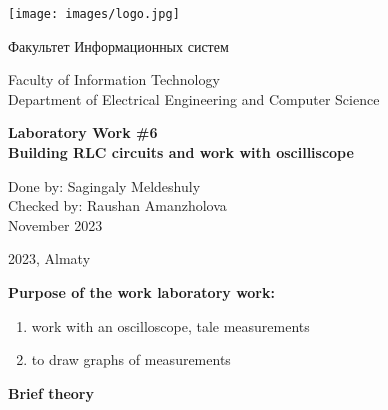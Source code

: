 \documentclass{article}
\begin{document}
\begin{titlepage}
    \centering
    \texttt{[image: images/logo.jpg]}
    
    \vspace{0cm} %
    {\fontsize{40}{48}\selectfont Факультет Информационных систем} %
    
    \vspace{0.1cm} %
    
    \begin{center} %
        Faculty of Information Technology\\
        Department of Electrical Engineering and Computer Science
    \end{center}
    
    \vfill %
    
    
    {\LARGE\bfseries Laboratory Work \#6}\\
    {\LARGE\bfseries Building RLC circuits and work with oscilliscope}
    \vspace{4cm} %
    
    \begin{flushright}
        Done by: Sagingaly Meldeshuly \\
        Checked by: Raushan Amanzholova \\
        November 2023
    \end{flushright}
    
    \vfill %
    \begin{center}
        2023, Almaty
    \end{center}
    
\end{titlepage}


\begin{flushleft}
\textbf{Purpose of the work laboratory work:}
\end{flushleft}
\begin{enumerate}
    \i
tem Build and analysis RLC circuit.
    \item work with an oscilloscope, tale measurements
    \item to draw graphs of measurements
\end{enumerate}

\begin{flushleft}
\textbf{Brief theory}
\end{flushleft}
\end{document}
